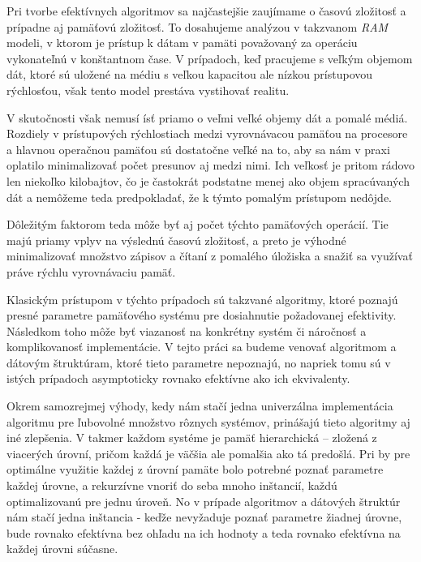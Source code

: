 
Pri tvorbe efektívnych algoritmov sa najčastejšie zaujímame o časovú zložitosť a prípadne aj pamäťovú zložitosť. To dosahujeme analýzou v takzvanom \emph{RAM} modeli, v ktorom je prístup k dátam v pamäti považovaný za operáciu vykonateľnú v konštantnom čase. V prípadoch, keď pracujeme s veľkým objemom dát, ktoré sú uložené na médiu s veľkou kapacitou ale nízkou prístupovou rýchlosťou, však tento model prestáva vystihovať realitu.

V skutočnosti však nemusí ísť priamo o veľmi veľké objemy dát a pomalé médiá. Rozdiely v prístupových rýchlostiach medzi vyrovnávacou pamäťou na procesore a hlavnou operačnou pamäťou sú dostatočne veľké na to, aby sa nám v praxi oplatilo minimalizovať počet presunov aj medzi nimi. Ich veľkosť je pritom rádovo len niekoľko kilobajtov, čo je častokrát podstatne menej ako objem spracúvaných dát a nemôžeme teda predpokladať, že k týmto pomalým prístupom nedôjde.

Dôležitým faktorom teda môže byť aj počet týchto pamäťových operácií. Tie majú priamy vplyv na výslednú časovú zložitosť, a preto je výhodné minimalizovať množstvo zápisov a čítaní z pomalého úložiska a snažiť sa využívať práve rýchlu vyrovnávaciu pamäť. 

Klasickým prístupom v týchto prípadoch sú takzvané \aware algoritmy, ktoré poznajú presné parametre pamäťového systému pre dosiahnutie požadovanej efektivity. Následkom toho môže byť viazanosť na konkrétny systém či náročnosť a komplikovanosť implementácie. V tejto práci sa budeme venovať \obliv algoritmom a dátovým štruktúram, ktoré tieto parametre nepoznajú, no napriek tomu sú v istých prípadoch asymptoticky rovnako efektívne ako ich \aware ekvivalenty.

Okrem samozrejmej výhody, kedy nám stačí jedna univerzálna implementácia algoritmu pre ľubovolné množstvo rôznych systémov, prinášajú tieto algoritmy aj iné zlepšenia. V takmer každom systéme je pamäť hierarchická -- zložená z viacerých úrovní, pričom každá je väčšia ale pomalšia ako tá predošlá. Pri \aware by pre optimálne využitie každej z úrovní pamäte bolo potrebné poznať parametre každej úrovne, a rekurzívne vnoriť do seba mnoho inštancií, každú optimalizovanú pre jednu úroveň. No v prípade \obliv algoritmov a dátových štruktúr nám stačí jedna inštancia - keďže nevyžaduje poznať parametre žiadnej úrovne, bude rovnako efektívna bez ohľadu na ich hodnoty a teda rovnako efektívna na každej úrovni súčasne.

